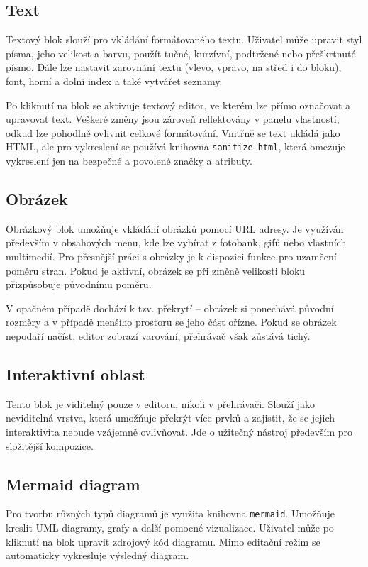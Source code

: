 \subsection{Text}

Textový blok slouží pro vkládání formátovaného textu. 
Uživatel může upravit styl písma, jeho velikost a barvu, použít tučné, kurzívní, podtržené nebo přeškrtnuté písmo. 
Dále lze nastavit zarovnání textu (vlevo, vpravo, na střed i do bloku), font, horní a dolní index a také vytvářet seznamy. 

Po kliknutí na blok se aktivuje textový editor, ve kterém lze přímo označovat a upravovat text. 
Veškeré změny jsou zároveň reflektovány v panelu vlastností, odkud lze pohodlně ovlivnit celkové formátování. 
Vnitřně se text ukládá jako HTML, ale pro vykreslení se používá knihovna \texttt{sanitize-html}, která omezuje vykreslení jen na bezpečné a povolené značky a atributy.

\subsection{Obrázek}

Obrázkový blok umožňuje vkládání obrázků pomocí URL adresy. 
Je využíván především v obsahových menu, kde lze vybírat z fotobank, gifů nebo vlastních multimedií. 
Pro přesnější práci s obrázky je k dispozici funkce pro uzamčení poměru stran. 
Pokud je aktivní, obrázek se při změně velikosti bloku přizpůsobuje původnímu poměru. 

V opačném případě dochází k tzv. překrytí -- obrázek si ponechává původní rozměry a v případě menšího prostoru se jeho část ořízne.
Pokud se obrázek nepodaří načíst, editor zobrazí varování, přehrávač však zůstává tichý.

\subsection{Interaktivní oblast}

Tento blok je viditelný pouze v editoru, nikoli v přehrávači.
Slouží jako neviditelná vrstva, která umožňuje překrýt více prvků a zajistit, že se jejich interaktivita nebude vzájemně ovlivňovat.
Jde o užitečný nástroj především pro složitější kompozice.

\subsection{Mermaid diagram}

Pro tvorbu různých typů diagramů je využita knihovna \texttt{mermaid}. 
Umožňuje kreslit UML diagramy, grafy a další pomocné vizualizace. 
Uživatel může po kliknutí na blok upravit zdrojový kód diagramu. 
Mimo editační režim se automaticky vykresluje výsledný diagram.

